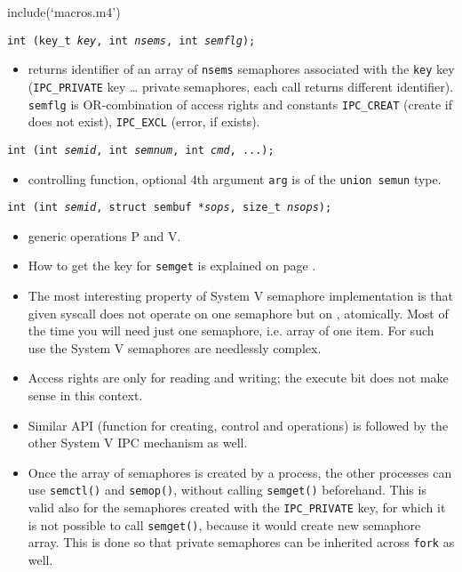 include(`macros.m4')


\begin{slide}
\texttt{int (key\_t \emph{key}, int \emph{nsems}, int \emph{semflg});}
\begin{itemize}
\item returns identifier of an array of \texttt{nsems} semaphores associated
with the \texttt{key} key (\texttt{IPC\_PRIVATE} key \dots{} private semaphores,
each call returns different identifier). 
\texttt{semflg} is OR-combination of access rights and constants
\texttt{IPC\_CREAT} (create if does not exist),
\texttt{IPC\_EXCL} (error, if exists). 
\end{itemize}
\texttt{int (int \emph{semid}, int \emph{semnum},
int \emph{cmd}, ...);}
\begin{itemize}
\item controlling function, optional 4th argument \texttt{arg} is of the
\texttt{union~semun} type.
\end{itemize}
\texttt{int (int \emph{semid}, struct sembuf *\emph{sops}, size\_t \emph{nsops});}
\begin{itemize}
\item generic operations P and V.
\end{itemize}
\end{slide}

\label{SYSVSEM}

\begin{itemize}
\item How to get the key for \texttt{semget} is explained on page
\pageref{FTOK}.
\item The most interesting property of System V semaphore implementation is
that given syscall does not operate on one semaphore but on , atomically.
Most of the time you will need just one semaphore, i.e. array of one item.
For such use the System V semaphores are needlessly complex.
\item Access rights are only for reading and writing; the execute bit does not
make sense in this context.
\item Similar API (function for creating, control and operations) is followed by
the other System V IPC mechanism as well.
\item Once the array of semaphores is created by a process, the other processes
can use \texttt{semctl()} and \texttt{semop()}, without calling
\texttt{semget()} beforehand. This is valid also for the semaphores created with
the \texttt{IPC\_PRIVATE} key, for which it is not possible to call
\texttt{semget()}, because it would create new semaphore array. This is done so
that private semaphores can be inherited across \texttt{fork} as well.
\end{itemize}

